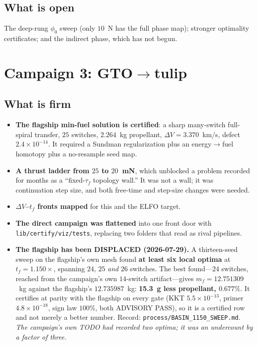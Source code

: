 \documentclass[11pt]{article}
\newcommand{\mf}{m_f}
\newcommand{\dV}{\Delta V}
\newcommand{\camp}[1]{\texttt{#1}}
\begin{document}
\subsection{What is open}

The deep-rung $\phi_0$ sweep (only $10$~N has the full phase map); stronger
optimality certificates; and the indirect phase, which has not begun.

\section{Campaign 3: GTO$\to$tulip}

\subsection{What is firm}

\begin{itemize}
  \item \textbf{The flagship min-fuel solution is certified}: a sharp
  many-switch full-spiral transfer, $25$ switches, $2.264$~kg propellant,
  $\dV = 3.370$~km/s, defect $2.4\times10^{-14}$. It required a Sundman
  regularization plus an energy$\to$fuel homotopy plus a no-resample seed map.
  \item \textbf{A thrust ladder from $25$ to $20$~mN}, which unblocked a
  problem recorded for months as a ``fixed-$\tau_f$ topology wall.'' It was not
  a wall; it was continuation step size, and both free-time and step-size
  changes were needed.
  \item \textbf{$\dV$--$t_f$ fronts mapped} for this and the ELFO target.
  \item \textbf{The direct campaign was flattened} into one front door with
  \camp{lib/certify/viz/tests}, replacing two folders that read as rival
  pipelines.
  \item \textbf{The flagship has been DISPLACED (2026-07-29).} A thirteen-seed
  sweep on the flagship's own mesh found \textbf{at least six local optima} at
  $t_f = 1.150\times$, spanning $24$, $25$ \emph{and} $26$ switches. The best
  found---$24$ switches, reached from the campaign's own $14$-switch
  artifact---gives $\mf = 12.751309$~kg against the flagship's $12.735987$~kg:
  \textbf{15.3~g less propellant, $0.677\%$}. It certifies at parity with the
  flagship on every gate (KKT $5.5\times10^{-13}$, primer $4.8\times10^{-18}$,
  sign law $100\%$, both ADVISORY PASS), so it is a certified row and not merely
  a better number. Record: \camp{process/BASIN\_1150\_SWEEP.md}.
  \emph{The campaign's own TODO had recorded two optima; it was an undercount
  by a factor of three.}
\end{itemize}
\end{document}
